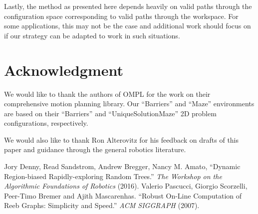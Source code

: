 \documentclass[conference]{IEEEtran}
\begin{document}
Lastly, the method as presented here depends heavily on valid paths through the configuration space corresponding to valid paths through the workspace. For some applications, this may not be the case and additional work should focus on if our strategy can be adapted to work in such situations.

\section*{Acknowledgment}

We would like to thank the authors of OMPL for the work on their comprehensive motion planning library. Our ``Barriers'' and ``Maze'' environments are based on their ``Barriers'' and ``UniqueSolutionMaze'' 2D problem configurations, respectively.

We would also like to thank Ron Alterovitz for his feedback on drafts of this paper and guidance through the general robotics literature.

\begin{thebibliography}{2}
Jory Denny, Read Sandstrom, Andrew Bregger, Nancy M. Amato, ``Dynamic Region-biased Rapidly-exploring Random Trees.'' \emph{The Workshop on the Algorithmic Foundations of Robotics} (2016).
Valerio Pascucci, Giorgio Scorzelli, Peer-Timo Bremer and Ajith Mascarenhas. ``Robust On-Line Computation of Reeb Graphs: Simplicity and Speed.'' \emph{ACM SIGGRAPH} (2007).
\end{thebibliography}
\end{document}
